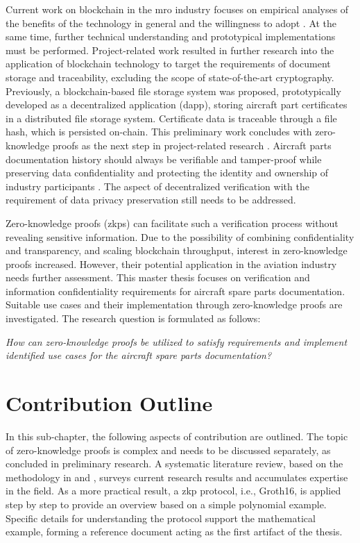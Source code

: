 Current work on blockchain in the \acrshort{mro} industry focuses on empirical analyses of the benefits of the technology in general and the willingness to adopt \citep{efthymiou}. At the same time, further technical understanding and prototypical implementations must be performed. Project-related work resulted in further research into the application of blockchain technology to target the requirements of document storage and traceability, excluding the scope of state-of-the-art cryptography. Previously, a blockchain-based file storage system was proposed, prototypically developed as a decentralized application (\acrshort{dapp}), storing aircraft part certificates in a distributed file storage system. Certificate data is traceable through a file hash, which is persisted on-chain. This preliminary work concludes with zero-knowledge proofs as the next step in project-related research \citep{ZedelJ}. Aircraft parts documentation history should always be verifiable and tamper-proof while preserving data confidentiality and protecting the identity and ownership of industry participants \citep{Wickboldt2019BlockchainFW}. The aspect of decentralized verification with the requirement of data privacy preservation still needs to be addressed.

Zero-knowledge proofs (\acrshort{zkp}s) can facilitate such a verification process without revealing sensitive information. Due to the possibility of combining confidentiality and transparency, and scaling blockchain throughput, interest in zero-knowledge proofs increased. However, their potential application in the aviation industry needs further assessment. This master thesis focuses on verification and information confidentiality requirements for aircraft spare parts documentation. Suitable use cases and their implementation through zero-knowledge proofs are investigated. The research question is formulated as follows:

\begin{center}
\textit{How can zero-knowledge proofs be utilized to satisfy requirements and implement identified use cases for the aircraft spare parts documentation?}  
\end{center}

\section{Contribution Outline}
In this sub-chapter, the following aspects of contribution are outlined. The topic of zero-knowledge proofs is complex and needs to be discussed separately, as concluded in preliminary research. A systematic literature review, based on the methodology in \citet{vomBrockeJan2019TDgs} and \citet{Webster2002AnalyzingTP}, surveys current research results and accumulates expertise in the field. As a more practical result, a \acrshort{zkp} protocol, i.e., Groth16, is applied step by step to provide an overview based on a simple polynomial example. Specific details for understanding the protocol support the mathematical example, forming a reference document acting as the first artifact of the thesis.

